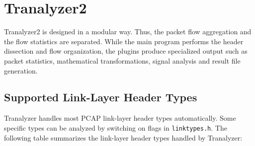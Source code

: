 \section{Tranalyzer2}\label{s:tranalyzer2}
Tranalyzer2 is designed in a modular way. Thus, the packet flow aggregation and the flow statistics are separated. While the main program performs the header dissection and flow organization, the plugins produce specialized output such as packet statistics, mathematical transformations, signal analysis and result file generation.

\subsection{Supported Link-Layer Header Types}
Tranalyzer handles most PCAP link-layer header types automatically. Some specific types can be analyzed by switching on flags in {\tt linktypes.h}. The following table summarizes the link-layer header types handled by Tranalyzer:

